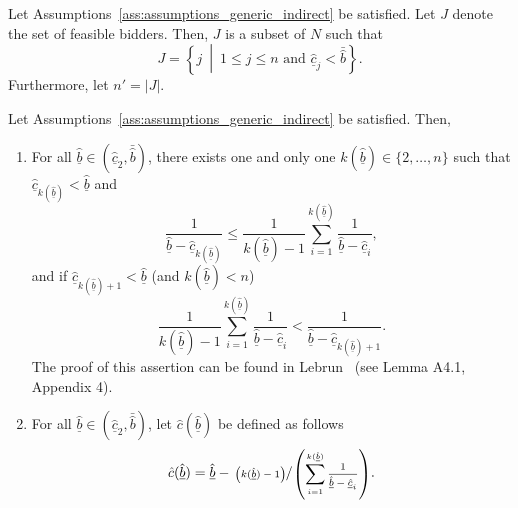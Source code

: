 \begin{define}
\label{def:feasible_bidders_indirect}
Let Assumptions~\ref{ass:assumptions_generic_indirect} be satisfied. Let $J$ denote the set of feasible bidders. Then, $J$ is a subset of $N$ such that
\begin{equation}
  J = \left\{j \:\middle\vert\: 1\leq j\leq n \textrm{ and } \underline{\hat{c}}_j < \bar{\hat{b}}\right\}.
\end{equation}
Furthermore, let $n' = |J|$.
\end{define}

\begin{define}
\label{def:lower_bound_bids_indirect}
Let Assumptions~\ref{ass:assumptions_generic_indirect} be satisfied. Then,
\begin{enumerate}
  \item For all $\underline{\hat{b}}\in (\underline{\hat{c}}_2, \bar{\hat{b}})$, there exists one and only one $k(\underline{\hat{b}})\in \{2,\dotsc,n\}$ such that $\underline{\hat{c}}_{k(\underline{\hat{b}})} < \underline{\hat{b}}$ and
  \begin{equation}
    \frac{1}{\underline{\hat{b}} - \underline{\hat{c}}_{k(\underline{\hat{b}})}}\leq \frac{1}{k(\underline{\hat{b}}) - 1}\sum_{i=1}^{k(\underline{\hat{b}})}\frac{1}{\underline{\hat{b}} - \underline{\hat{c}}_i},
  \end{equation}
  and if $\underline{\hat{c}}_{k(\underline{\hat{b}})+1} < \underline{\hat{b}}$ (and $k(\underline{\hat{b}}) < n$)
  \begin{equation}
    \frac{1}{k(\underline{\hat{b}}) - 1}\sum_{i=1}^{k(\underline{\hat{b}})}\frac{1}{\underline{\hat{b}} - \underline{\hat{c}}_i} < \frac{1}{\underline{\hat{b}} - \underline{\hat{c}}_{k(\underline{\hat{b}})+1}}.
  \end{equation}
  The proof of this assertion can be found in Lebrun~\cite{Lebrun2004} (see Lemma A4.1, Appendix 4).
  \item For all $\underline{\hat{b}}\in (\underline{\hat{c}}_2, \bar{\hat{b}})$, let $\hat{c}(\underline{\hat{b}})$ be defined as follows
  \begin{equation}
  \label{eq:lower_bound_bids_cost_indirect}
    \hat{c}(\underline{\hat{b}}) = \underline{\hat{b}} - \sfrac{\left(k(\underline{\hat{b}})-1\right)}{\left(\sum_{i=1}^{k(\underline{\hat{b}})} \frac{1}{\underline{\hat{b}} - \underline{\hat{c}}_i}\right)}.
  \end{equation}
\end{enumerate}
\end{define}
